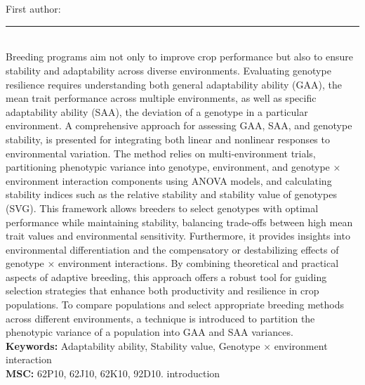 \documentclass[10pt,twoside]{article}
\begin{document}
\noindent\begin{minipage}[t][\textheight]{\textwidth}
\\[0.35em]
{\itshape }\\[0.2em]
{\footnotesize First author: }\\[0.45em]
\noindent\rule{\textwidth}{0.3pt}\\[0.4em]
{\footnotesize Breeding programs aim not only to improve crop performance but also to ensure stability and adaptability across diverse environments. Evaluating genotype resilience requires understanding both general adaptability ability (GAA), the mean trait performance across multiple environments, as well as specific adaptability ability (SAA), the deviation of a genotype in a particular environment. A comprehensive approach for assessing GAA, SAA, and genotype stability, is presented for integrating both linear and nonlinear responses to environmental variation. The method relies on multi-environment trials, partitioning phenotypic variance into genotype, environment, and genotype × environment interaction components using ANOVA models, and calculating stability indices such as the relative stability and stability value of genotypes (SVG). This framework allows breeders to select genotypes with optimal performance while maintaining stability, balancing trade-offs between high mean trait values and environmental sensitivity. Furthermore, it provides insights into environmental differentiation and the compensatory or destabilizing effects of genotype × environment interactions. By combining theoretical and practical aspects of adaptive breeding, this approach offers a robust tool for guiding selection strategies that enhance both productivity and resilience in crop populations. To compare populations and select appropriate breeding methods across different environments, a technique is introduced to partition the phenotypic variance of a population into GAA and SAA variances.}\\[0.4em]
{\footnotesize\bfseries Keywords:} {\footnotesize Adaptability ability, Stability value, Genotype × environment interaction}\\[0.15em]
{\footnotesize\bfseries MSC:} {\footnotesize 62P10, 62J10, 62K10, 92D10. introduction}\\
\vfill
\end{minipage}
\newpage
\end{document}
